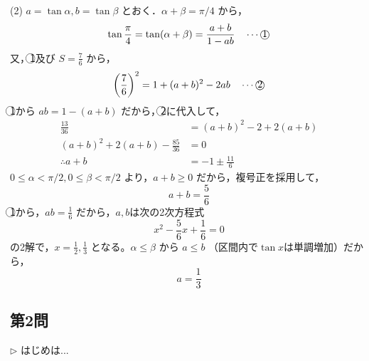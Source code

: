 \documentclass[../main.tex]{subfiles}
\begin{document}
(2) $a = \tan \alpha, b = \tan \beta$ とおく．$\alpha + \beta = \pi/4$ から，
\[
  \tan \frac{\pi}{4} = \tan (\alpha + \beta) = \frac{a+b}{1-ab} \quad \cdots \text{\textcircled{1}}
\]
又，\textcircled{1}及び $S = \frac{7}{6}$ から，
\[
  \left(\frac{7}{6}\right)^2 = 1 + (a+b)^2 - 2ab \quad \cdots \text{\textcircled{2}}
\]
\textcircled{1}から $ab = 1 - (a+b)$ だから，\textcircled{2}に代入して，
\begin{align*}
  \frac{13}{36} &= (a+b)^2 - 2 + 2(a+b) \\
  (a+b)^2 + 2(a+b) - \frac{85}{36} &= 0 \\
  \therefore a+b &= -1 \pm \frac{11}{6}
\end{align*}
$0 \le \alpha < \pi/2, 0 \le \beta < \pi/2$ より，$a+b \ge 0$ だから，複号正を採用して，
\[
  a+b = \frac{5}{6}
\]
\textcircled{1}から，$ab = \frac{1}{6}$ だから，$a, b$は次の2次方程式
\[
  x^2 - \frac{5}{6}x + \frac{1}{6} = 0
\]
の2解で，$x = \frac{1}{2}, \frac{1}{3}$ となる。$\alpha \le \beta$ から $a \le b$ （区間内で$\tan x$は単調増加）だから，
\[
  a = \frac{1}{3}
\]

\subsection*{第2問}
$\triangleright$ はじめは...
\end{document}
